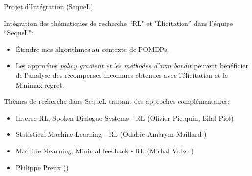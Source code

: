 \begin{frame}{Projet d'Intégration (SequeL)}

Intégration des thématiques de recherche ``RL" et "\'Elicitation” dans l'équipe ``SequeL":
\begin{block}

\begin{itemize}
	\item Étendre mes algorithmes au contexte de POMDPs.
	\item Les approches \textit{policy gradient et les méthodes d'arm bandit}
	peuvent bénéficier de l'analyse des récompenses inconnues obtenues avec l'élicitation et le Minimax regret. 
\end{itemize}
\end{block}

 Thèmes de recherche dans SequeL traitant des  approches complémentaires:
\begin{block}

\begin{itemize}
	\item  Inverse RL, Spoken Dialogue Systems - RL (Olivier Pietquin, Bilal Piot)
	\item  Statistical Machine Learning - RL (Odalric-Ambrym Maillard )
	\item  Machine Mearning, Minimal feedback - RL (Michal Valko )
	\item Philippe Preux ()
	\end{itemize}
\end{block}
\end{frame}

